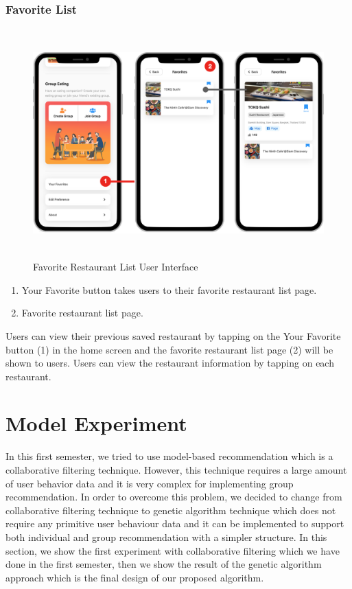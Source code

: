 \documentclass[12pt,oneside,openright,a4paper]{cpe-english-project}
\begin{document}
\newpage
\subsubsection{Favorite List}
\begin{figure}[H]\centering
\includegraphics[height=250pt]{./images/4ui_FavoriteRestaurantListUserInterface.png}
\caption{Favorite Restaurant List User Interface}\label{fig:4ui_FavoriteRestaurantListUserInterface}
\end{figure}\vspace{-24pt}

\begin{enumerate}
\item Your Favorite button takes users to their favorite restaurant list page.
\item Favorite restaurant list page.
\end{enumerate}

Users can view their previous saved restaurant by tapping on the Your Favorite button (1) in the home screen and the favorite restaurant list page (2) will be shown to users. Users can view the restaurant information by tapping on each restaurant.


\section{Model Experiment}

In this first semester, we tried to use model-based recommendation which is a collaborative filtering technique. However, this technique requires a large amount of user behavior data and it is very complex for implementing group recommendation. In order to overcome this problem, we decided to change from collaborative filtering technique to genetic algorithm technique which does not require any primitive user behaviour data and it can be implemented to support both individual and group recommendation with a simpler structure. In this section, we show the first experiment with collaborative filtering which we have done in the first semester, then we show the result of the genetic algorithm approach which is the final design of our proposed algorithm.
\end{document}

